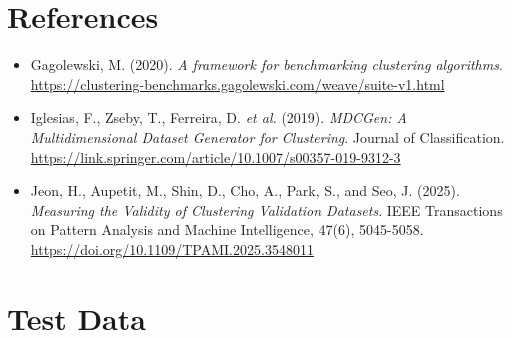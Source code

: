 \documentclass[a4paper,12pt]{article}
\begin{document}
\section{References}
\begin{itemize}
    \item Gagolewski, M. (2020). \textit{A framework for benchmarking clustering algorithms}. \url{https://clustering-benchmarks.gagolewski.com/weave/suite-v1.html}
    \item Iglesias, F., Zseby, T., Ferreira, D. \textit{et al.} (2019). \textit{MDCGen: A Multidimensional Dataset Generator for Clustering}. Journal of Classification. \url{https://link.springer.com/article/10.1007/s00357-019-9312-3}
    \item Jeon, H., Aupetit, M., Shin, D., Cho, A., Park, S., and Seo, J. (2025). \textit{Measuring the Validity of Clustering Validation Datasets}. IEEE Transactions on Pattern Analysis and Machine Intelligence, 47(6), 5045-5058. \url{https://doi.org/10.1109/TPAMI.2025.3548011}
\end{itemize}

\newpage

\section{Test Data}
\end{document}

